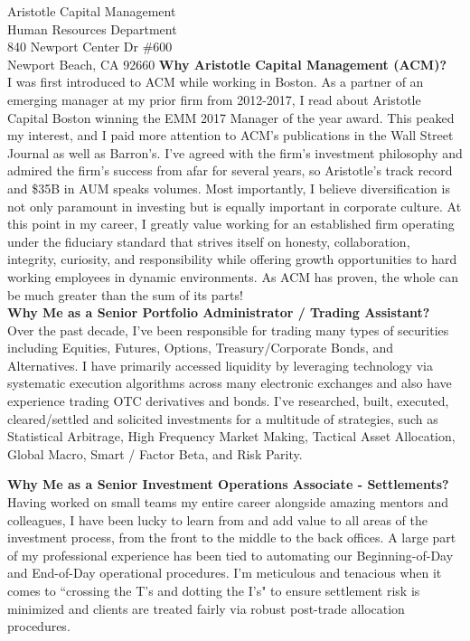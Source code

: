 \documentclass[10pt]{letter}
\begin{document}
\begin{letter}{
  Aristotle Capital Management \\
  Human Resources Department \\
  840 Newport Center Dr \#600 \\
  Newport Beach, CA 92660
}
\textbf{Why Aristotle Capital Management (ACM)?} \\
I was first introduced to ACM while working in Boston.
As a partner of an emerging manager at my prior firm from 2012-2017, I read 
about Aristotle Capital Boston winning the EMM 2017 Manager of the year award.
This peaked my interest, and I paid more attention to ACM's publications in the Wall Street
Journal as well as Barron's. I've agreed with the firm's investment philosophy and
admired the firm's success from afar for several years, so Aristotle's track record
and \$35B in AUM speaks volumes. Most importantly, I believe diversification is not only paramount in investing but is equally important
in corporate culture. At this point in my career, I greatly value working for an established
firm operating under the fiduciary standard that strives itself on honesty, collaboration, integrity,
curiosity, and responsibility while offering growth opportunities to hard working
employees in dynamic environments. As ACM has proven, the whole can be much greater
than the sum of its parts! \\ 

\textbf{Why Me as a Senior Portfolio Administrator / Trading Assistant?} \\
Over the past decade, I've been responsible for trading many types of securities including
Equities, Futures, Options, Treasury/Corporate Bonds, and Alternatives.
I have primarily accessed liquidity by leveraging technology via
systematic execution algorithms across many electronic exchanges and also have experience
trading OTC derivatives and bonds. I've researched, built, executed, cleared/settled
and solicited investments for a multitude of strategies, such as Statistical Arbitrage,
High Frequency Market Making, Tactical Asset Allocation, Global Macro, Smart / Factor Beta,
and Risk Parity.

\newpage

\textbf{Why Me as a Senior Investment Operations Associate - Settlements?} \\
Having worked on small teams my entire career alongside amazing mentors and colleagues,
I have been lucky to learn from and add value to all areas of the investment process,
from the front to the middle to the back offices. A large part of my professional experience
has been tied to automating our Beginning-of-Day and End-of-Day operational procedures.
I'm meticulous and tenacious when it comes to ``crossing the T's and dotting the I's"
to ensure settlement risk is minimized and clients are treated fairly via robust
post-trade allocation procedures. \\


\end{letter}
\end{document}

